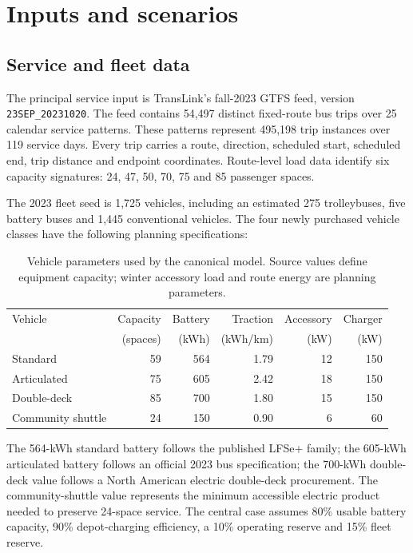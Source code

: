 \documentclass[12pt,letterpaper]{article}
\begin{document}
\section{Inputs and scenarios}

\subsection{Service and fleet data}

The principal service input is TransLink's fall-2023 GTFS feed, version \texttt{23SEP\_20231020}. The feed contains 54,497 distinct fixed-route bus trips over 25 calendar service patterns. These patterns represent 495,198 trip instances over 119 service days. Every trip carries a route, direction, scheduled start, scheduled end, trip distance and endpoint coordinates. Route-level load data identify six capacity signatures: 24, 47, 50, 70, 75 and 85 passenger spaces.\cite{gtfs2023,guidelines2018,loadcsv}

The 2023 fleet seed is 1,725 vehicles, including an estimated 275 trolleybuses, five battery buses and 1,445 conventional vehicles. The four newly purchased vehicle classes have the following planning specifications:

\begin{table}[htbp]
\centering
\caption{Vehicle parameters used by the canonical model. Source values define equipment capacity; winter accessory load and route energy are planning parameters.}
\begin{tabular}{lrrrrr}
\toprule
Vehicle & Capacity & Battery & Traction & Accessory & Charger\\
 & (spaces) & (kWh) & (kWh/km) & (kW) & (kW)\\
\midrule
Standard & 59 & 564 & 1.79 & 12 & 150\\
Articulated & 75 & 605 & 2.42 & 18 & 150\\
Double-deck & 85 & 700 & 1.80 & 15 & 150\\
Community shuttle & 24 & 150 & 0.90 & 6 & 60\\
\bottomrule
\end{tabular}
\end{table}

The 564-kWh standard battery follows the published LFSe+ family; the 605-kWh articulated battery follows an official 2023 bus specification; the 700-kWh double-deck value follows a North American electric double-deck procurement. The community-shuttle value represents the minimum accessible electric product needed to preserve 24-space service. The central case assumes 80\% usable battery capacity, 90\% depot-charging efficiency, a 10\% operating reserve and 15\% fleet reserve.\cite{nova2021,winnipeg2023,newflyer2025,foothill2024,endera2023}
\end{document}
